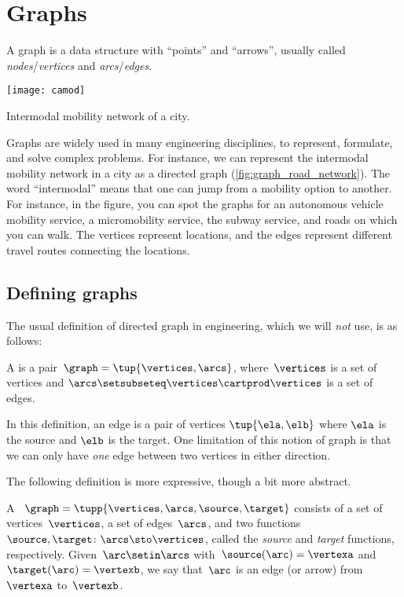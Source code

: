 
\section{Graphs}

A graph is a data structure with ``points'' and ``arrows'', usually called \emph{no\-des}/\emph{ver\-tices} and \emph{arcs}/\emph{edges}.

\begin{marginfigure}
    \texttt{[image: camod]}
    \caption{Intermodal mobility network of a city.}
    \label{fig:graph_road_network}
\end{marginfigure}

Graphs are widely used in many engineering disciplines, to represent, formulate, and solve complex problems.
For instance, we can represent the intermodal mobility network in a city as a directed graph (\cref{fig:graph_road_network}).
The word ``intermodal'' means that one can jump from a mobility option to another.
For instance, in the figure, you can spot the graphs for an autonomous vehicle mobility service, a micromobility service, the subway service, and roads on which you can walk.
The vertices represent locations, and the edges represent different travel routes connecting the locations.

\subsection{Defining graphs}

The usual definition of directed graph in engineering, which we will \emph{not} use, is as follows:

\begin{definition}
    \label{def:directed-graph}
    A  is a pair~$\graph=\tup{\vertices, \arcs}$, where~$\vertices$ is
    a set of vertices and $\arcs \setsubseteq \vertices \cartprod \vertices$ is a set of edges.
\end{definition}
In this definition, an edge is a pair of vertices $\tup{\ela,\elb}$ where $\ela$ is the source and $\elb$ is the target.
One limitation of this notion of graph is that we can only have \emph{one} edge between two vertices in either direction.

The following definition is more expressive, though a bit more abstract.

\begin{ctdefinition}
    \label{def:Graph}
    A ~$\graph=\tupp{\vertices,\arcs, \source,\target}$ consists of a set of vertices~$\vertices$, a set of edges~$\arcs$, and two functions~$\source,\target \colon \arcs \sto \vertices$, called the \emph{source} and \emph{target} functions, respectively.
    Given~$\arc\setin \arcs$ with~$\source(\arc)=\vertexa$ and~$\target(\arc)=\vertexb$, we say that~$\arc$ is an edge (or arrow) from~$\vertexa$ to~$\vertexb$.
\end{ctdefinition}

